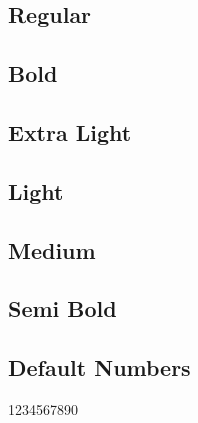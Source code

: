\documentclass{article}
\begin{document}
\subsection*{Regular}
\lipsum[1]


\subsection*{Bold}

\textbf{\lipsum[2]}

\subsection*{Extra Light} 

{\selectfont\lipsum[3]}


\subsection*{Light}
{\selectfont\lipsum[4]}

\subsection*{Medium}
{\selectfont\lipsum[5]}

\subsection*{Semi Bold}

{\selectfont\lipsum[6]}




\subsection*{Default Numbers}

1234567890
\end{document}
